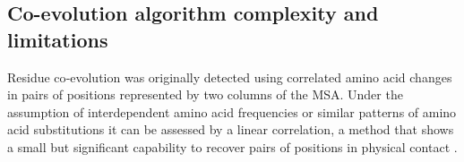 %

\subsection{Co-evolution algorithm complexity and limitations}

Residue co‐evolution was originally detected using correlated amino acid changes in pairs of positions represented by two columns of the MSA.
Under the assumption of interdependent amino acid frequencies or similar patterns of amino acid substitutions it can be assessed by a linear correlation, a method that shows a small but significant capability to recover pairs of positions in physical contact \cite{de2013emerging}.

